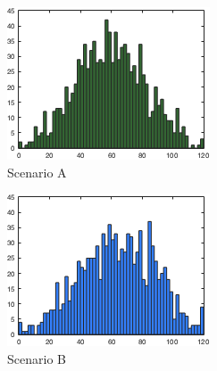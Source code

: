 \begin{figure}[h]
        \centering
        \begin{subfigure}[h]{0.32\textwidth}
                \includegraphics[width=\textwidth]{./img/4/HA-4RuleBased}
                \caption{Scenario A}
                \label{fig:histogramA}
        \end{subfigure}
        \begin{subfigure}[h]{0.32\textwidth}
                \includegraphics[width=\textwidth]{./img/4/HB-1RuleBased_3Random}
                \caption{Scenario B}
                \label{fig:histogramB}
        \end{subfigure}
        \begin{subfigure}[h]{0.32\textwidth}

\end{subfigure}
\end{figure}
